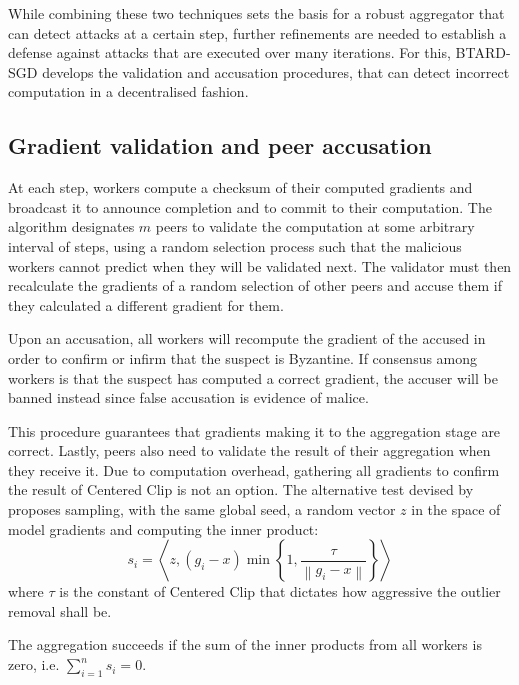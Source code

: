 \documentclass{article}
\begin{document}
While combining these two techniques sets the basis for a robust aggregator that can detect attacks at a certain step, further refinements are needed to establish a defense against attacks that are executed over many iterations. For this, BTARD-SGD develops the validation and accusation procedures, that can detect incorrect computation in a decentralised fashion. 

\subsection{Gradient validation and peer accusation}
At each step, workers compute a checksum of their computed gradients and broadcast it to announce completion and to commit to their computation. The algorithm designates $m$ peers to validate the computation at some arbitrary interval of steps, using a random selection process such that the malicious workers cannot predict when they will be validated next. The validator must then recalculate the gradients of a random selection of other peers and accuse them if they calculated a different gradient for them. 

Upon an accusation, all workers will recompute the gradient of the accused in order to confirm or infirm that the suspect is Byzantine. If consensus among workers is that the suspect has computed a correct gradient, the accuser will be banned instead since false accusation is evidence of malice.


This procedure guarantees that gradients making it to the aggregation stage are correct. Lastly, peers also need to validate the result of their aggregation when they receive it. Due to computation overhead, gathering all gradients to confirm the result of Centered Clip is not an option. The alternative test devised by \cite{gorbunov2021secure} proposes sampling, with the same global seed, a random vector $z$ in the space of model gradients and computing the inner product:
\begin{equation}
s_{i}=\left\langle z,\left(g_{i}-x\right) \min \left\{1, \frac{\tau}{\left\|g_{i}-x\right\|}\right\}\right\rangle
\end{equation}
where $\tau$ is the constant of Centered Clip that dictates how aggressive the outlier removal shall be.

The aggregation succeeds if the sum of the inner products from all workers is zero, i.e. $\sum_{i = 1}^{n} s_i = 0$.
\end{document}
